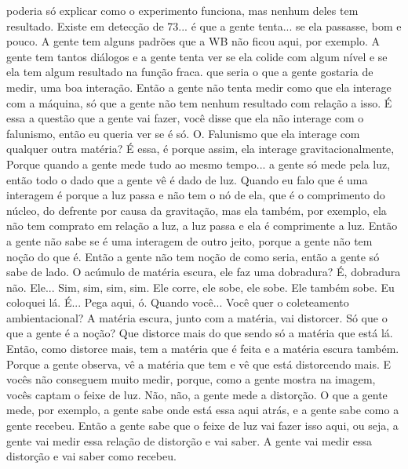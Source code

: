 \documentclass[
	article,			%
	11pt,				%
	twoside,			%
	a4paper,			%
	english,			%
	brazil,				%
	sumario=tradicional
	]{abntex2}
\begin{document}
poderia só explicar como o experimento funciona, mas nenhum deles tem resultado. Existe em detecção de 73... é que a gente tenta... se ela passasse, bom e pouco. A gente tem alguns padrões que a WB não ficou aqui, por exemplo. A gente tem tantos diálogos e a gente tenta ver se ela colide com algum nível e se ela tem algum resultado na função fraca. que seria o que a gente gostaria de medir, uma boa interação. Então a gente não tenta medir como que ela interage com a máquina, só que a gente não tem nenhum resultado com relação a isso. É essa a questão que a gente vai fazer, você disse que ela não interage com o falunismo, então eu queria ver se é só. O. Falunismo que ela interage com qualquer outra matéria? É essa, é porque assim, ela interage gravitacionalmente, Porque quando a gente mede tudo ao mesmo tempo... a gente só mede pela luz, então todo o dado que a gente vê é dado de luz. Quando eu falo que é uma interagem é porque a luz passa e não tem o nó de ela, que é o comprimento do núcleo, do defrente por causa da gravitação, mas ela também, por exemplo, ela não tem comprato em relação a luz, a luz passa e ela é comprimente a luz. Então a gente não sabe se é uma interagem de outro jeito, porque a gente não tem noção do que é. Então a gente não tem noção de como seria, então a gente só sabe de lado. O acúmulo de matéria escura, ele faz uma dobradura? É, dobradura não. Ele... Sim, sim, sim, sim. Ele corre, ele sobe, ele sobe. Ele também sobe. Eu coloquei lá. É... Pega aqui, ó. Quando você... Você quer o coleteamento ambientacional? A matéria escura, junto com a matéria, vai distorcer. Só que o que a gente é a noção? Que distorce mais do que sendo só a matéria que está lá. Então, como distorce mais, tem a matéria que é feita e a matéria escura também. Porque a gente observa, vê a matéria que tem e vê que está distorcendo mais. E vocês não conseguem muito medir, porque, como a gente mostra na imagem, vocês captam o feixe de luz. Não, não, a gente mede a distorção. O que a gente mede, por exemplo, a gente sabe onde está essa aqui atrás, e a gente sabe como a gente recebeu. Então a gente sabe que o feixe de luz vai fazer isso aqui, ou seja, a gente vai medir essa relação de distorção e vai saber. A gente vai medir essa distorção e vai saber como recebeu.


\end{document}
